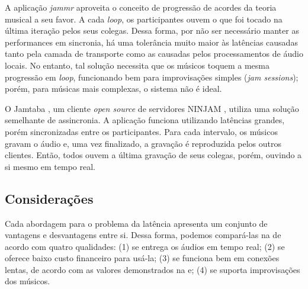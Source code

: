 A aplicação \textit{jammr} \cite{jammr} aproveita o conceito de progressão de acordes da teoria musical a seu favor. A cada \textit{loop}, os participantes ouvem o que foi tocado na última iteração pelos seus colegas. Dessa forma, por não ser necessário manter as performances em sincronia, há uma tolerância muito maior às latências causadas tanto pela camada de transporte como as causadas pelos processamentos de áudio locais. No entanto, tal solução necessita que os músicos toquem a mesma progressão em \textit{loop}, funcionando bem para improvisações simples (\textit{jam sessions}); porém, para músicas mais complexas, o sistema não é ideal.

O Jamtaba \cite{jamtaba}, um cliente \textit{open source} de servidores NINJAM \cite{ninjam}, utiliza uma solução semelhante de assincronia. A aplicação funciona utilizando latências grandes, porém sincronizadas entre os participantes. Para cada intervalo, os músicos gravam o áudio e, uma vez finalizado, a gravação é reproduzida pelos outros clientes. Então, todos ouvem a última gravação de seus colegas, porém, ouvindo a si mesmo em tempo real.

\subsection{Considerações}

Cada abordagem para o problema da latência apresenta um conjunto de vantagens e desvantagens entre si. Dessa forma, podemos compará-las na  de acordo com quatro qualidades: (1) se entrega os áudios em tempo real; (2) se oferece baixo custo financeiro para usá-la; (3) se funciona bem em conexões lentas, de acordo com as valores demonstrados na  e; (4) se suporta improvisações dos músicos. 

\renewcommand{\arraystretch}{2}

